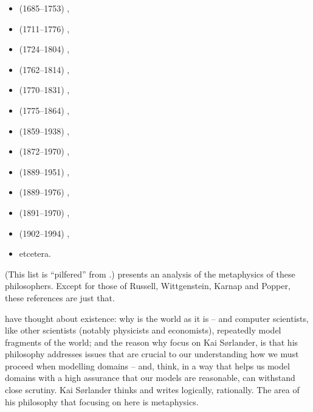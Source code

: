 {{\begin{multicols}{2}
\begin{itemize}
\item {} (1685--1753) \cite{Berkeley:Dines},
\item {} (1711--1776) \cite{Hume:Dines},
\item {} (1724--1804) \cite{Kant:Dines},
\item {} (1762--1814) \cite{Fichte:Dines},
\item {} (1770--1831) \cite{Hegel:Dines},
\item {} (1775--1864) \cite{Schelling:Dines},
\item {} (1859--1938) \cite{Husserl:Dines},
\item {} (1872--1970) \cite{Rus12,Russell1910-1913,Russell1905,Russell1919},
\item {} (1889--1951) \cite{Wittgenstein21,Wittgenstein58},
\item {} (1889--1976) \cite{Heidegger27},
\item {} (1891--1970) \cite{RudolfCarnap1928,Car37,Car42},
\item {} (1902--1994) \cite{popper-tlosd59,popper-car-tgask63},
\item etcetera.
\end{itemize}
\end{multicols}
\noindent
(This list is ``pilfered''
      from \cite[Pages 33--127]{kaisorlander2016}.) \label{citations-2}
      \cite{kaisorlander2016} presents an analysis of the metaphysics
      of these philosophers. Except for those of Russell, Wittgenstein,
      Karnap and Popper, these references are just that.\normalsize}}{} \nyl  have
      thought about existence: \nyl why is the world as it is -- \nyl and
      computer scientists, \nyl like other scientists (notably
      physicists and economists), \nyl repeatedly model fragments of
      the world;
\mnewfoil
\pind and the reason why  focus on Kai S{\o}rlander, \nyl is
      that his philosophy addresses issues \nyl that are crucial to our
      understanding \nyl {} how we must proceed when modelling domains --
      \nyl and,
       think, in a way that helps us model domains \nyl with a high
      assurance that our models are reasonable, \nyl can withstand close scrutiny.
\pind Kai S{\o}rlander thinks and writes logically, rationally.
\pind The area of his philosophy that  focusing on here is metaphysics.
\afslut
\afslut

